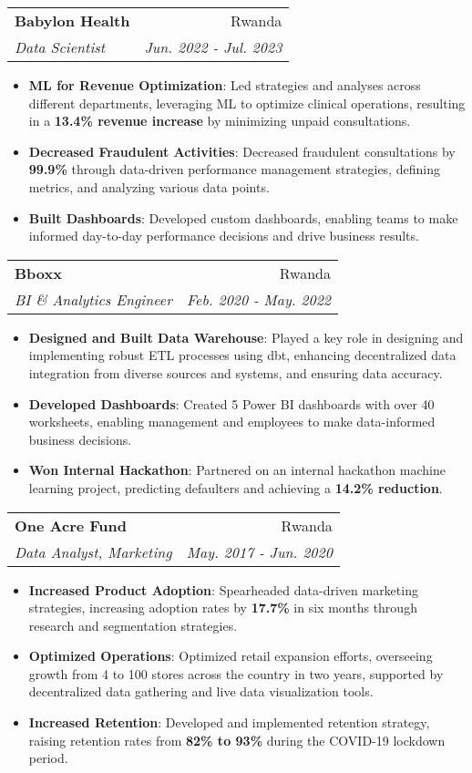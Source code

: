\documentclass[letterpaper,11pt]{article}
\makeatletter
\newcommand{\resumeItem}[2]{
  \item\small{
    \textbf{#1}{: #2 \vspace{-2pt}}
  }
}
\newcommand{\resumeSubheading}[4]{
  \vspace{-1pt}\item
    \begin{tabular*}{0.97\textwidth}[t]{l@{\extracolsep{\fill}}r}
      \textbf{#1} & \textcolor{NavyBlue}{#2} \\
      \textit{\small#3} & \textit{\small #4} \\
    \end{tabular*}\vspace{-5pt}
}
\newcommand{\resumeItemListStart}{\begin{itemize}}
\newcommand{\resumeItemListEnd}{\end{itemize}\vspace{-5pt}}
\makeatother
\begin{document}
    \resumeSubheading
      {Babylon Health}{Rwanda}
      {Data Scientist}{Jun. 2022 - Jul. 2023}
      \resumeItemListStart
        \resumeItem{ML for Revenue Optimization}
          {\small{Led strategies and analyses across different departments, leveraging ML to optimize clinical operations, resulting in a \textbf{\textcolor{NavyBlue}{13.4\% revenue increase}} by minimizing unpaid consultations.}}
        \resumeItem{Decreased Fraudulent Activities}
          {\small{Decreased fraudulent consultations by \textbf{\textcolor{NavyBlue}{99.9\%}} through data-driven performance management strategies, defining metrics, and analyzing various data points.}}
      \resumeItem{Built Dashboards}
          {\small{Developed custom dashboards, enabling teams to make informed day-to-day performance decisions and drive business results.}}
      \resumeItemListEnd
      

    \resumeSubheading
      {Bboxx}{Rwanda}
      {BI \& Analytics Engineer}{Feb. 2020 - May. 2022}
      \resumeItemListStart
        \resumeItem{Designed and Built Data Warehouse}
          {\small{Played a key role in designing and implementing robust ETL processes using dbt, enhancing decentralized data integration from diverse sources and systems, and ensuring data accuracy.}}
        \resumeItem{Developed Dashboards}
          {\small{Created 5 Power BI dashboards with over 40 worksheets, enabling management and employees to make data-informed business decisions.}}
        \resumeItem{Won Internal Hackathon}
          {\small{Partnered on an internal hackathon machine learning project, predicting defaulters and achieving a \textbf{\textcolor{NavyBlue}{14.2\% reduction}}.}}
      \resumeItemListEnd

    \resumeSubheading
      {One Acre Fund}{Rwanda}
      {Data Analyst, Marketing}{May. 2017 - Jun. 2020}
      \resumeItemListStart
        \resumeItem{Increased Product Adoption}
          {\small{Spearheaded data-driven marketing strategies, increasing adoption rates by \textbf{\textcolor{NavyBlue}{17.7\%}} in six months through research and segmentation strategies.}}
        \resumeItem{Optimized Operations}
          {\small{Optimized retail expansion efforts, overseeing growth from 4 to 100 stores across the country in two years, supported by decentralized data gathering and live data visualization tools.}}
      \resumeItem{Increased Retention}
          {\small{Developed and implemented retention strategy, raising retention rates from \textbf{\textcolor{NavyBlue}{82\% to 93\%}} during the COVID-19 lockdown period.}}
      \resumeItemListEnd
      
\end{document}
